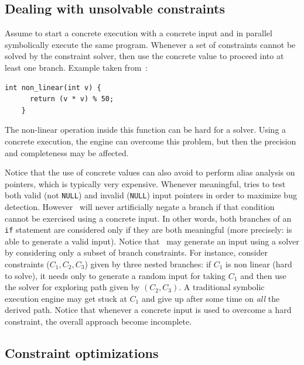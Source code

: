 \subsection{Dealing with unsolvable constraints} 

Assume to start a concrete execution with a concrete input and in parallel symbolically execute the same program. Whenever a set of constraints cannot be solved by the constraint solver, then use the concrete value to proceed into at least one branch. Example taken from~\cite{CS-CACM13}:
    \begin{lstlisting}[basicstyle=\ttfamily\small]
    int non_linear(int v) {
      return (v * v) % 50;
    }
    \end{lstlisting}
The non-linear operation inside this function can be hard for a solver. Using a concrete execution, the engine can overcome this problem, but then the precision and completeness may be affected.

Notice that the use of concrete values can also avoid to perform alias analysis on pointers, which is typically very expensive. Whenever meaningful, \cite{DART-PLDI05} tries to test both valid (not {\tt NULL}) and invalid ({\tt NULL}) input pointers in order to maximize bug detection. However~\cite{DART-PLDI05} will never artificially negate a branch if that condition cannot be exercised using a concrete input. In other words, both branches of an {\tt if} statement are considered only if they are both meaningful (more precisely: \cite{DART-PLDI05} is able to generate a valid input). Notice that~\cite{DART-PLDI05} may generate an input using a solver by considering only a subset of branch constraints. For instance, consider constraints ($C_1, C_2, C_3$) given by three nested branches: if $C_1$ is non linear (hard to solve), it needs only to generate a random input for taking $C_1$ and then use the solver for exploring path given by $(C_2, C_3)$. A traditional symbolic execution engine may get stuck at $C_1$ and give up after some time on {\em all} the derived path. Notice that whenever a concrete input is used to overcome a hard constraint, the overall approach become incomplete.

\subsection{Constraint optimizations}
\label{constraint-optimizations}

